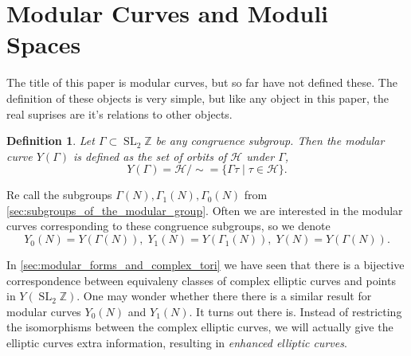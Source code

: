 \documentclass[a4paper]{article}
\theoremstyle{theoremdd}
\theoremstyle{definitiondd}
\newtheorem{definition}[theorem]{Definition}
\theoremstyle{remarkdd}
\newcommand{\Z}{\mathbb{Z}}
\DeclareMathOperator{\SL}{SL}
\begin{document}
\section{Modular Curves and Moduli Spaces} \label{sec:modular_curves_and_moduli_spaces}
The title of this paper is modular curves, but so far have not defined these. 
The definition of these objects is very simple, but like any object in this paper, the real suprises are it's relations to other objects. 
\begin{definition}
	Let $\Gamma \subset \SL_2\Z$ be any congruence subgroup. Then the \emph{modular curve} $Y(\Gamma)$ is defined as the set of orbits of $\mathcal{H} $ under  $\Gamma$, \[
		Y(\Gamma) = \mathcal{H} / \sim = \{\Gamma \tau \;|\; \tau \in \mathcal{H} \} 
	.\] 
\end{definition}
Re call the subgroups $\Gamma(N), \Gamma_1(N), \Gamma_0(N)$ from \cref{sec:subgroups_of_the_modular_group}. 
Often we are interested in the modular curves corresponding to these congruence subgroups, so we denote \[
	Y_0(N) = Y(\Gamma(N)),\; Y_1(N) = Y(\Gamma_1(N)),\; Y(N) = Y(\Gamma(N))
.\]  
 
In \cref{sec:modular_forms_and_complex_tori} we have seen that there is a bijective correspondence between equivaleny classes of complex elliptic curves and points in $Y (\SL_2\Z)$. 
One may wonder whether there there is a similar result for modular curves $Y_0(N)$ and $Y_1(N)$.
It turns out there is. 
Instead of restricting the isomorphisms between the complex elliptic curves, we will actually give the elliptic curves extra information, resulting in \emph{enhanced elliptic curves}. 
\end{document}
